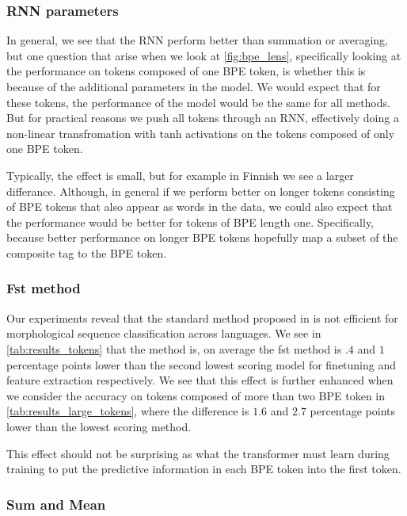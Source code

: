 \documentclass[11pt]{article}
\newcommand\citep{\cite}
\begin{document}
    \subsubsection{RNN parameters}
                In general, we see that the RNN perform better than
     summation or averaging, but one question that arise when we look
     at \cref{fig:bpe_lens}, specifically looking at the performance
     on tokens composed of one BPE token, is whether this is because
     of the additional parameters in the model. We would expect that
     for these tokens, the performance of the model would be the same
     for all methods. But for practical reasons we push all tokens
     through an RNN, effectively doing a non-linear transfromation
     with tanh activations on the tokens composed of only one BPE token.

        Typically, the effect is small, but for example in Finnish we
     see a larger differance. Although, in general if we perform
     better on longer tokens consisting of BPE tokens that also appear
     as words in the data, we could also expect that the performance
     would be better for tokens of BPE length one. Specifically,
     because better performance on longer BPE tokens hopefully map a
     subset of the composite tag to the BPE token.

    \subsubsection{Fst method}

            Our experiments reveal that the standard method proposed
     in \citep{devlin2018bert} is not efficient for morphological
     sequence classification across languages. We see in
     \cref{tab:results_tokens} that the method is, on average the fst
     method is $.4$ and $1$ percentage points lower than the second
     lowest scoring model for finetuning and feature extraction
     respectively.  We see that this effect is further enhanced when
     we consider the accuracy on tokens composed of more than two BPE
     token in \cref{tab:results_large_tokens}, where the difference is
     $1.6$ and $2.7$ percentage points lower than the lowest scoring
     method.

         This effect should not be surprising as what the transformer
     must learn during training to put the predictive information in
     each BPE token into the first token.  
    
    
    \subsubsection{Sum and Mean}
\end{document}
